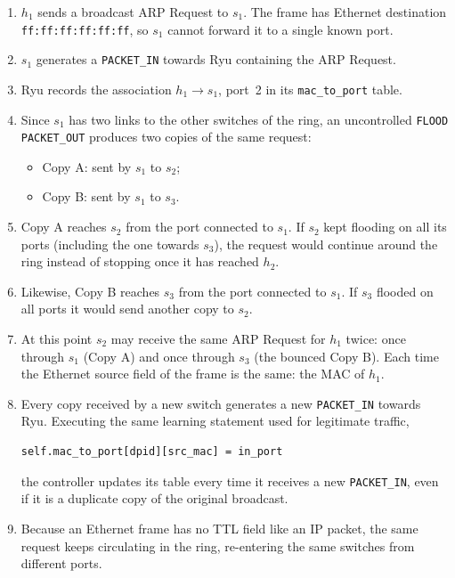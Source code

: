 \documentclass[11pt,a4paper]{article}
\newcommand{\code}[1]{\texttt{#1}}
\begin{document}
\begin{enumerate}
  \item $h_1$ sends a broadcast ARP Request to $s_1$. The frame has Ethernet
        destination \code{ff:ff:ff:ff:ff:ff}, so $s_1$ cannot forward it to a
        single known port.
  \item $s_1$ generates a \code{PACKET\_IN} towards Ryu containing the ARP
        Request.
  \item Ryu records the association $h_1\to s_1$, port~2 in its
        \code{mac\_to\_port} table.
  \item Since $s_1$ has two links to the other switches of the ring, an
        uncontrolled \code{FLOOD} \code{PACKET\_OUT} produces two copies of the
        same request:
        \begin{itemize}
          \item Copy A: sent by $s_1$ to $s_2$;
          \item Copy B: sent by $s_1$ to $s_3$.
        \end{itemize}
  \item Copy A reaches $s_2$ from the port connected to $s_1$. If $s_2$ kept
        flooding on all its ports (including the one towards $s_3$), the
        request would continue around the ring instead of stopping once it has
        reached $h_2$.
  \item Likewise, Copy B reaches $s_3$ from the port connected to $s_1$. If
        $s_3$ flooded on all ports it would send another copy to $s_2$.
  \item At this point $s_2$ may receive the same ARP Request for $h_1$ twice:
        once through $s_1$ (Copy A) and once through $s_3$ (the bounced Copy B).
        Each time the Ethernet source field of the frame is the same: the MAC of
        $h_1$.
  \item Every copy received by a new switch generates a new \code{PACKET\_IN}
        towards Ryu. Executing the same learning statement used for legitimate
        traffic,
        \begin{lstlisting}[style=py]
self.mac_to_port[dpid][src_mac] = in_port
        \end{lstlisting}
        the controller updates its table every time it receives a new
        \code{PACKET\_IN}, even if it is a duplicate copy of the original
        broadcast.
  \item Because an Ethernet frame has no TTL field like an IP packet, the same
        request keeps circulating in the ring, re-entering the same switches
        from different ports.
\end{enumerate}
\end{document}
